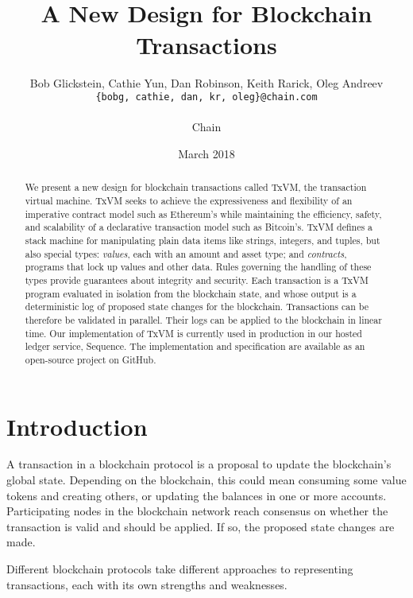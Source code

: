 \documentclass{article}
\title{\txvm{} \\ \large A New Design for Blockchain Transactions}
\date{March 2018}
\newcommand{\txvm}{TxVM}
\begin{document}
\author{
    \normalsize Bob Glickstein, Cathie Yun, Dan Robinson, Keith Rarick, Oleg Andreev \\
    \texttt{\normalsize \{bobg, cathie, dan, kr, oleg\}@chain.com} \\ \\
    Chain
}
\maketitle

\begin{abstract}

We present a new design for blockchain transactions called \txvm{},
the transaction virtual machine. \txvm{} seeks to achieve the
expressiveness and flexibility of an imperative contract model such as
Ethereum's while maintaining the efficiency, safety, and scalability of
a declarative transaction model such as Bitcoin's. \txvm{} defines a
stack machine for manipulating plain data items like strings,
integers, and tuples, but also special types: \textit{values}, each
with an amount and asset type; and \textit{contracts}, programs that
lock up values and other data. Rules governing the handling of these
types provide guarantees about integrity and security. Each
transaction is a \txvm{} program evaluated in isolation from the
blockchain state, and whose output is a deterministic log of proposed
state changes for the blockchain. Transactions can be therefore be
validated in parallel. Their logs can be applied to the blockchain in
linear time. Our implementation of \txvm{} is currently used in
production in our hosted ledger service, Sequence. The implementation
and specification are available as an open-source project on GitHub.

\end{abstract}

\section{Introduction}

A transaction in a blockchain protocol is a proposal to update the
blockchain's global state.  Depending on the blockchain, this could
mean consuming some value tokens and creating others, or updating the
balances in one or more accounts.  Participating nodes in the
blockchain network reach consensus on whether the transaction is valid
and should be applied. If so, the proposed state changes are made.

Different blockchain protocols take different approaches to
representing transactions, each with its own strengths and weaknesses.
\end{document}
